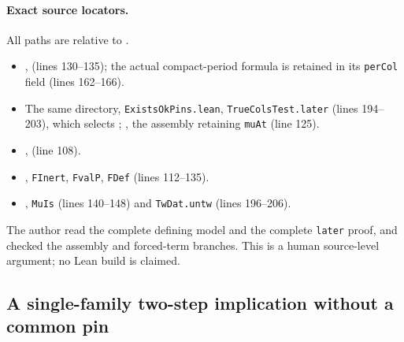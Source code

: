 \documentclass[11pt,a4paper]{article}
\theoremstyle{definition}
\theoremstyle{remark}
\begin{document}
\paragraph{Exact source locators.}
All paths are relative to .
\begin{itemize}
\item {},  (lines 130--135);
the actual compact-period formula is retained in its
\texttt{perCol} field (lines 162--166).
\item The same directory, \texttt{ExistsOkPins.lean},
\texttt{TrueColsTest.later} (lines 194--203), which selects
;
, the assembly
retaining \texttt{muAt} (line 125).
\item {},
 (line 108).
\item {},
\texttt{FInert}, \texttt{FvalP}, \texttt{FDef}
(lines 112--135).
\item {}, \texttt{MuIs}
(lines 140--148) and \texttt{TwDat.untw} (lines 196--206).
\end{itemize}
The author read the complete defining model and the complete
\texttt{later} proof, and checked the assembly and forced-term
branches.  This is a human source-level argument; no Lean build is
claimed.


\subsection{A single-family two-step implication without a common pin}
\label{sec:single-family-m2}
\end{document}
